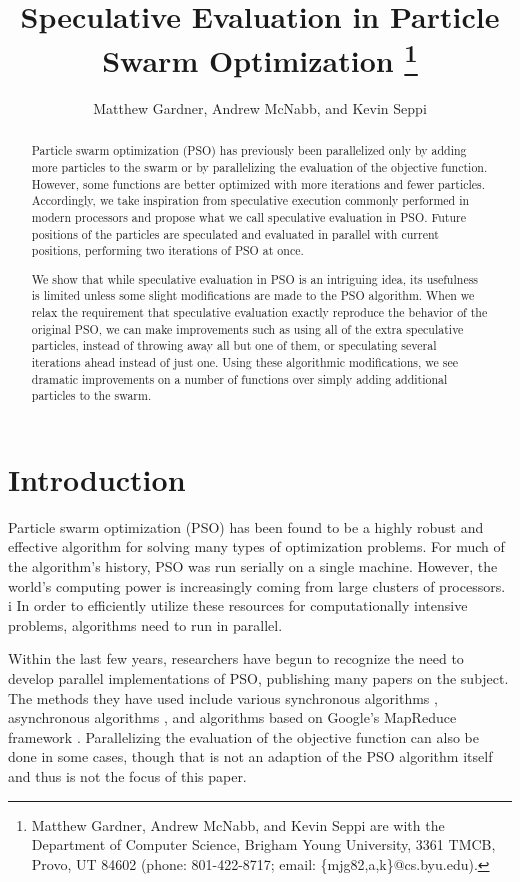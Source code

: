 \documentclass[journal,letterpaper]{IEEEtran}
\title{\ \\ \LARGE\bf Speculative Evaluation in Particle Swarm Optimization%
\thanks{Matthew Gardner, Andrew McNabb, and Kevin Seppi are with the Department
of Computer Science, Brigham Young University, 3361 TMCB, Provo, UT 84602
(phone: 801-422-8717; email: \{mjg82,a,k\}@cs.byu.edu).}%
}
\date{}
\author{Matthew Gardner, Andrew McNabb, and Kevin Seppi}
\begin{document}
\maketitle

\begin{abstract}

Particle swarm optimization (PSO) has previously been parallelized only by 
adding more particles to the swarm or by parallelizing the evaluation of the
objective function.  However, some functions are better optimized with more
iterations and fewer particles.  Accordingly, we take inspiration from 
speculative execution commonly performed in modern processors and propose what
we call speculative evaluation in PSO.  Future positions of the particles are
speculated and evaluated in parallel with current positions, performing two
iterations of PSO at once.

We show that while speculative evaluation in PSO is an intriguing idea, its
usefulness is limited unless some slight modifications are made to the PSO
algorithm.  When we relax the requirement that speculative evaluation exactly
reproduce the behavior of the original PSO, we can make improvements such as
using all of the extra speculative particles, instead of throwing away all but
one of them, or speculating several iterations ahead instead of just one.
Using these algorithmic modifications, we see dramatic improvements on a number
of functions over simply adding additional particles to the swarm.

\end{abstract}

\section{Introduction}
\label{sec:intro}

Particle swarm optimization (PSO) has been found to be a highly robust and
effective algorithm for solving many types of optimization problems.  For much
of the algorithm's history, PSO was run serially on a single machine.  However,
the world's computing power is increasingly coming from large clusters of
processors.  i
In order to efficiently utilize these resources for
computationally intensive problems, algorithms need to run in parallel.

Within the last few years, researchers have begun to recognize the need to
develop parallel implementations of PSO, publishing many papers on the subject.
The methods they have used include various synchronous algorithms
\cite{belal-ijicis04,chu-sci06,jin-aps05,parsopoulos-aia04,schutte-ijnme04},
asynchronous algorithms \cite{koh-ijnme06,mostaghim-report06,venter-wcsmo05},
and algorithms based on Google's MapReduce framework \cite{mcnabb-cec07}.
Parallelizing the evaluation of the objective function can also be done in some
cases, though that is not an adaption of the PSO algorithm itself and thus is
not the focus of this paper.
\end{document}
